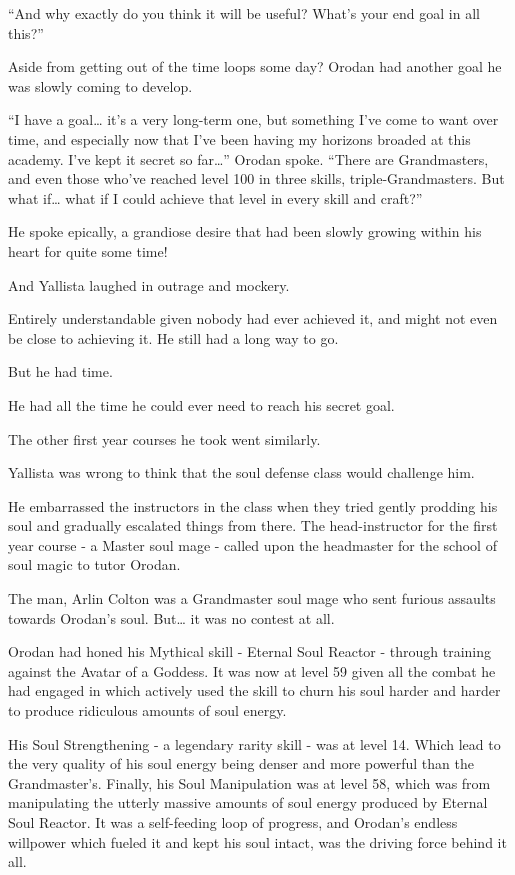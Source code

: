 \documentclass[a4paper,10pt]{book}
\begin{document}
“And why exactly do you think it will be useful? What’s your end goal in all this?”\par
Aside from getting out of the time loops some day? Orodan had another goal he was slowly coming to develop.\par
“I have a goal… it’s a very long-term one, but something I’ve come to want over time, and especially now that I’ve been having my horizons broaded at this academy. I’ve kept it secret so far…” Orodan spoke. “There are Grandmasters, and even those who’ve reached level 100 in three skills, triple-Grandmasters. But what if… what if I could achieve that level in every skill and craft?”\par
He spoke epically, a grandiose desire that had been slowly growing within his heart for quite some time!\par
And Yallista laughed in outrage and mockery.\par
Entirely understandable given nobody had ever achieved it, and might not even be close to achieving it. He still had a long way to go.\par
But he had time.\par
He had all the time he could ever need to reach his secret goal.\par
\par
The other first year courses he took went similarly.\par
Yallista was wrong to think that the soul defense class would challenge him.\par
He embarrassed the instructors in the class when they tried gently prodding his soul and gradually escalated things from there. The head-instructor for the first year course - a Master soul mage - called upon the headmaster for the school of soul magic to tutor Orodan.\par
The man, Arlin Colton was a Grandmaster soul mage who sent furious assaults towards Orodan’s soul. But… it was no contest at all.\par
Orodan had honed his Mythical skill - Eternal Soul Reactor - through training against the Avatar of a Goddess. It was now at level 59 given all the combat he had engaged in which actively used the skill to churn his soul harder and harder to produce ridiculous amounts of soul energy.\par
His Soul Strengthening - a legendary rarity skill - was at level 14. Which lead to the very quality of his soul energy being denser and more powerful than the Grandmaster’s. Finally, his Soul Manipulation was at level 58, which was from manipulating the utterly massive amounts of soul energy produced by Eternal Soul Reactor. It was a self-feeding loop of progress, and Orodan’s endless willpower which fueled it and kept his soul intact, was the driving force behind it all.\par
\end{document}
